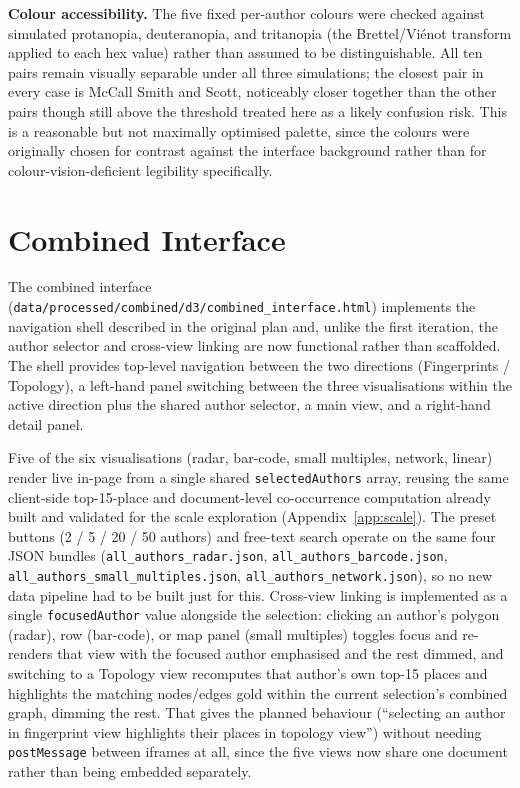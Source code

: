 \documentclass[logo,msc]{infthesis}
\begin{document}
\textbf{Colour accessibility.} The five fixed per-author colours were checked against simulated protanopia, deuteranopia, and tritanopia (the Brettel/Vi{\'e}not transform applied to each hex value) rather than assumed to be distinguishable. All ten pairs remain visually separable under all three simulations; the closest pair in every case is McCall Smith and Scott, noticeably closer together than the other pairs though still above the threshold treated here as a likely confusion risk. This is a reasonable but not maximally optimised palette, since the colours were originally chosen for contrast against the interface background rather than for colour-vision-deficient legibility specifically.
 
\section{Combined Interface}
\label{sec:combined-interface}

The combined interface (\texttt{data/processed/combined/d3/combined\_interface.html}) implements the navigation shell described in the original plan and, unlike the first iteration, the author selector and cross-view linking are now functional rather than scaffolded. The shell provides top-level navigation between the two directions (Fingerprints / Topology), a left-hand panel switching between the three visualisations within the active direction plus the shared author selector, a main view, and a right-hand detail panel.

Five of the six visualisations (radar, bar-code, small multiples, network, linear) render live in-page from a single shared \texttt{selectedAuthors} array, reusing the same client-side top-15-place and document-level co-occurrence computation already built and validated for the scale exploration (Appendix~\ref{app:scale}). The preset buttons (2 / 5 / 20 / 50 authors) and free-text search operate on the same four JSON bundles (\texttt{all\_authors\_radar.json}, \texttt{all\_authors\_barcode.json}, \texttt{all\_authors\_small\_multiples.json}, \texttt{all\_authors\_network.json}), so no new data pipeline had to be built just for this. Cross-view linking is implemented as a single \texttt{focusedAuthor} value alongside the selection: clicking an author's polygon (radar), row (bar-code), or map panel (small multiples) toggles focus and re-renders that view with the focused author emphasised and the rest dimmed, and switching to a Topology view recomputes that author's own top-15 places and highlights the matching nodes/edges gold within the current selection's combined graph, dimming the rest. That gives the planned behaviour (``selecting an author in fingerprint view highlights their places in topology view'') without needing \texttt{postMessage} between iframes at all, since the five views now share one document rather than being embedded separately.
\end{document}
